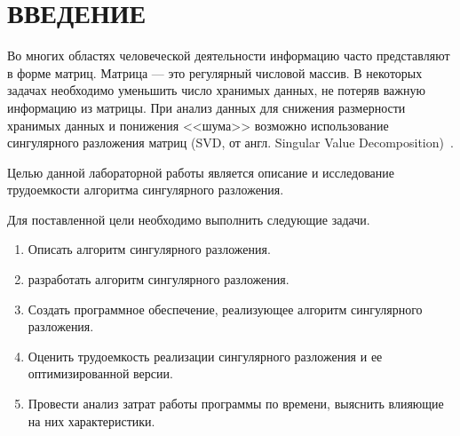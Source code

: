 \chapter*{\hfill{\centering  ВВЕДЕНИЕ}\hfill}


Во многих областях человеческой деятельности информацию часто представляют в форме матриц.
Матрица --- это регулярный числовой массив. В некоторых задачах необходимо уменьшить 
число хранимых данных, не потеряв важную информацию из матрицы. При анализ данных для снижения размерности хранимых данных и понижения <<шума>> возможно использование сингулярного разложения матриц (SVD, от англ. Singular Value Decomposition)~\cite{SVD}.


Целью данной лабораторной работы является описание и исследование трудоемкости алгоритма сингулярного разложения.

\label{sec:targets}
Для поставленной цели необходимо выполнить следующие задачи.
\begin{enumerate}
	\item Описать алгоритм сингулярного разложения.
	\item разработать алгоритм сингулярного разложения.
	\item Создать программное обеспечение, реализующее алгоритм сингулярного разложения.
	\item Оценить трудоемкость реализации сингулярного разложения и ее оптимизированной версии.
	\item Провести анализ затрат работы программы по времени, выяснить влияющие на них характеристики.
\end{enumerate}




